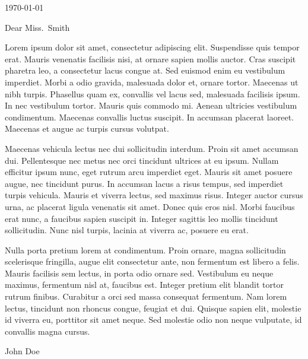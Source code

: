 \documentclass[11pt]{article}
\newlength\cvMargin
\begin{document}
\vspace{\dimexpr\coverletterheight\relax}

\begin{center}
\begin{minipage}{\coverletterwidth}
\today

\vspace{\baselineskip}



\vspace{\cvMargin}

Dear Miss.\ Smith

\vspace{\baselineskip}

Lorem ipsum dolor sit amet, consectetur adipiscing elit. Suspendisse quis tempor erat. Mauris venenatis facilisis nisi, at ornare sapien mollis auctor. Cras suscipit pharetra leo, a consectetur lacus congue at. Sed euismod enim eu vestibulum imperdiet. Morbi a odio gravida, malesuada dolor et, ornare tortor. Maecenas ut nibh turpis. Phasellus quam ex, convallis vel lacus sed, malesuada facilisis ipsum. In nec vestibulum tortor. Mauris quis commodo mi. Aenean ultricies vestibulum condimentum. Maecenas convallis luctus suscipit. In accumsan placerat laoreet. Maecenas et augue ac turpis cursus volutpat.

Maecenas vehicula lectus nec dui sollicitudin interdum. Proin sit amet accumsan dui. Pellentesque nec metus nec orci tincidunt ultrices at eu ipsum. Nullam efficitur ipsum nunc, eget rutrum arcu imperdiet eget. Mauris sit amet posuere augue, nec tincidunt purus. In accumsan lacus a risus tempus, sed imperdiet turpis vehicula. Mauris et viverra lectus, sed maximus risus. Integer auctor cursus urna, ac placerat ligula venenatis sit amet. Donec quis eros nisl. Morbi faucibus erat nunc, a faucibus sapien suscipit in. Integer sagittis leo mollis tincidunt sollicitudin. Nunc nisl turpis, lacinia at viverra ac, posuere eu erat.

Nulla porta pretium lorem at condimentum. Proin ornare, magna sollicitudin scelerisque fringilla, augue elit consectetur ante, non fermentum est libero a felis. Mauris facilisis sem lectus, in porta odio ornare sed. Vestibulum eu neque maximus, fermentum nisl at, faucibus est. Integer pretium elit blandit tortor rutrum finibus. Curabitur a orci sed massa consequat fermentum. Nam lorem lectus, tincidunt non rhoncus congue, feugiat et dui. Quisque sapien elit, molestie id viverra eu, porttitor sit amet neque. Sed molestie odio non neque vulputate, id convallis magna cursus.

\vspace{\cvMargin}

John Doe

\end{minipage}
\end{center}
\end{document}

